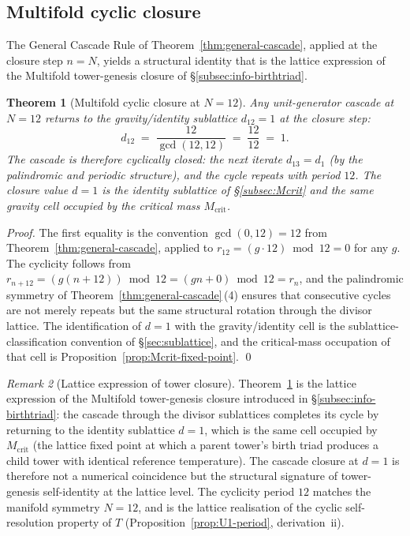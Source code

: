 \documentclass[11pt,a4paper]{article}
\newtheorem{theorem}{Theorem}[section]
\theoremstyle{definition}
\theoremstyle{remark}
\newtheorem{remark}[theorem]{Remark}
\begin{document}
\subsection{Multifold cyclic closure}\label{subsec:multifold-closure}

The General Cascade Rule of Theorem~\ref{thm:general-cascade}, applied at the closure step $n = N$, yields a structural identity that is the lattice expression of the Multifold tower-genesis closure of \S\ref{subsec:info-birthtriad}.

\begin{theorem}[Multifold cyclic closure at $N=12$]\label{thm:multifold-closure}
Any unit-generator cascade at $N=12$ returns to the gravity/identity sublattice $d_{12} = 1$ at the closure step:
\[
d_{12} \;=\; \frac{12}{\gcd(12,12)} \;=\; \frac{12}{12} \;=\; 1.
\]
The cascade is therefore cyclically closed: the next iterate $d_{13} = d_{1}$ (by the palindromic and periodic structure), and the cycle repeats with period $12$. The closure value $d=1$ is the identity sublattice of \S\ref{subsec:Mcrit} and the same gravity cell occupied by the critical mass $M_{\mathrm{crit}}$.
\end{theorem}

\begin{proof}
The first equality is the convention $\gcd(0,12) = 12$ from Theorem~\ref{thm:general-cascade}, applied to $r_{12} = (g\cdot 12) \bmod 12 = 0$ for any $g$. The cyclicity follows from $r_{n+12} = (g(n+12)) \bmod 12 = (gn + 0) \bmod 12 = r_{n}$, and the palindromic symmetry of Theorem~\ref{thm:general-cascade}\,(4) ensures that consecutive cycles are not merely repeats but the same structural rotation through the divisor lattice. The identification of $d=1$ with the gravity/identity cell is the sublattice-classification convention of \S\ref{sec:sublattice}, and the critical-mass occupation of that cell is Proposition~\ref{prop:Mcrit-fixed-point}. \qed
\end{proof}

\begin{remark}[Lattice expression of tower closure]\label{rem:multifold-closure}
Theorem~\ref{thm:multifold-closure} is the lattice expression of the Multifold tower-genesis closure introduced in \S\ref{subsec:info-birthtriad}: the cascade through the divisor sublattices completes its cycle by returning to the identity sublattice $d=1$, which is the same cell occupied by $M_{\mathrm{crit}}$ (the lattice fixed point at which a parent tower's birth triad produces a child tower with identical reference temperature). The cascade closure at $d=1$ is therefore not a numerical coincidence but the structural signature of tower-genesis self-identity at the lattice level. The cyclicity period $12$ matches the manifold symmetry $N=12$, and is the lattice realisation of the cyclic self-resolution property of $T$ (Proposition~\ref{prop:U1-period}, derivation~ii).
\end{remark}
\end{document}
